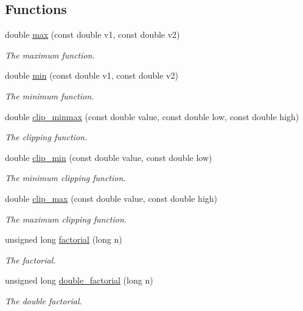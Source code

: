 \subsection*{Functions}
\begin{DoxyCompactItemize}
\item 
double \hyperlink{namespace_hoa_a18a09e9aa0bc178190832f0b625f8630}{max} (const double v1, const double v2)
\begin{DoxyCompactList}\small\item\em The maximum function. \end{DoxyCompactList}\item 
double \hyperlink{namespace_hoa_af938bba055dcde56bb2cd02e8eb1c4dc}{min} (const double v1, const double v2)
\begin{DoxyCompactList}\small\item\em The minimum function. \end{DoxyCompactList}\item 
double \hyperlink{namespace_hoa_a4b041c0e7c61bb6d819ce4e544ff3f90}{clip\-\_\-minmax} (const double value, const double low, const double high)
\begin{DoxyCompactList}\small\item\em The clipping function. \end{DoxyCompactList}\item 
double \hyperlink{namespace_hoa_a035f72d813d623708fc679234167652c}{clip\-\_\-min} (const double value, const double low)
\begin{DoxyCompactList}\small\item\em The minimum clipping function. \end{DoxyCompactList}\item 
double \hyperlink{namespace_hoa_a70a614a6370140a970f5e94afd244100}{clip\-\_\-max} (const double value, const double high)
\begin{DoxyCompactList}\small\item\em The maximum clipping function. \end{DoxyCompactList}\item 
unsigned long \hyperlink{namespace_hoa_af38450480ab6d8c9cbeee21d0384d59a}{factorial} (long n)
\begin{DoxyCompactList}\small\item\em The factorial. \end{DoxyCompactList}\item 
unsigned long \hyperlink{namespace_hoa_a8a19fc23057ab1e829bcb83b8e9bf236}{double\-\_\-factorial} (long n)
\begin{DoxyCompactList}\small\item\em The double factorial. \end{DoxyCompactList}\item 

\end{DoxyCompactItemize}

